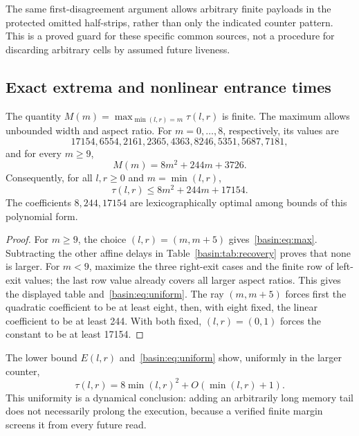 The same first-disagreement argument allows arbitrary finite payloads in the
protected omitted half-strips, rather than only the indicated counter pattern.
This is a proved guard for these specific common sources, not a procedure for
discarding arbitrary cells by assumed future liveness.

\subsection{Exact extrema and nonlinear entrance times}
\begin{theorem}\label{basin:thm:max}
The quantity $M(m)=\max_{\min(l,r)=m}\tau(l,r)$ is finite.
The maximum allows unbounded width and aspect ratio.
For $m=0,\ldots,8$, respectively, its values are
\[
 17154,6554,2161,2365,4363,8246,5351,5687,7181,
\]
and for every $m\ge9$,
\begin{equation}
 M(m)=8m^2+244m+3726.                                     \label{basin:eq:max}
\end{equation}
Consequently, for all $l,r\ge0$ and $m=\min(l,r)$,
\begin{equation}
 \tau(l,r)\le8m^2+244m+17154.                             \label{basin:eq:uniform}
\end{equation}
The coefficients $8,244,17154$ are lexicographically optimal among bounds of
this polynomial form.
\end{theorem}
\begin{proof}
For $m\ge9$, the choice $(l,r)=(m,m+5)$ gives~\eqref{basin:eq:max}. Subtracting the
other affine delays in Table~\ref{basin:tab:recovery} proves that none is larger.
For $m<9$, maximize the three right-exit cases and the finite row of left-exit
values; the last row value already covers all larger aspect ratios. This gives
the displayed table and~\eqref{basin:eq:uniform}. The ray $(m,m+5)$ forces first the
quadratic coefficient to be at least eight, then, with eight fixed, the linear
coefficient to be at least 244. With both fixed, $(l,r)=(0,1)$ forces the constant
to be at least 17154.
\end{proof}

The lower bound $E(l,r)$ and~\eqref{basin:eq:uniform} show, uniformly in the larger
counter,
\[
 \tau(l,r)=8\min(l,r)^2+O(\min(l,r)+1).
\]
This uniformity is a dynamical conclusion: adding an arbitrarily long memory
tail does not necessarily prolong the execution, because a verified finite
margin screens it from every future read.

